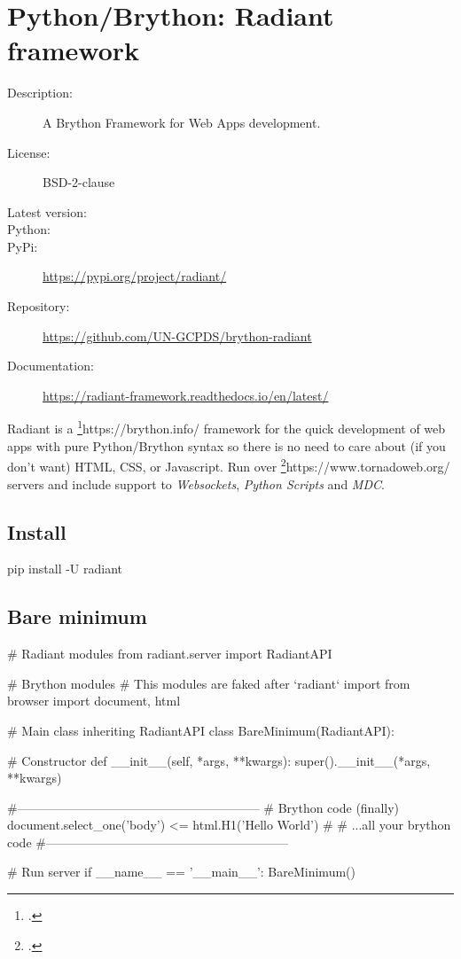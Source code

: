 \chapter{Python/Brython: Radiant framework}\label{appendix:brython-radiant}

\begin{description}
   \item[Description:]      A Brython Framework for Web Apps development.
   \item[License:]          BSD-2-clause
   \item[Latest version:]   
   \item[Python:]           
   \item[PyPi:]             \url{https://pypi.org/project/radiant/}
   \item[Repository:]       \url{https://github.com/UN-GCPDS/brython-radiant}
   \item[Documentation:]    \url{https://radiant-framework.readthedocs.io/en/latest/}
\end{description}
\hrulefill

Radiant is a \footcite{Brython}{https://brython.info/} framework for the quick development of web apps with pure Python/Brython syntax so there is no need to care about (if you don’t want) HTML, CSS, or Javascript. Run over \footcite{Tornado}{https://www.tornadoweb.org/} servers and include support to \textit{Websockets}, \textit{Python Scripts} and \textit{MDC}.


\section{Install}
\begin{python}
pip install -U radiant
\end{python}


\section{Bare minimum}
\begin{python}
# Radiant modules
from radiant.server import RadiantAPI

# Brython modules
# This modules are faked after `radiant` import
from browser import document, html  

# Main class inheriting RadiantAPI
class BareMinimum(RadiantAPI):

    # Constructor
    def __init__(self, *args, **kwargs):
        super().__init__(*args, **kwargs)

        #-----------------------------------------------------------
        # Brython code (finally)
        document.select_one('body') <= html.H1('Hello World')
        #
        # ...all your brython code
        #-----------------------------------------------------------

# Run server
if __name__ == '__main__':
    BareMinimum()
\end{python}


